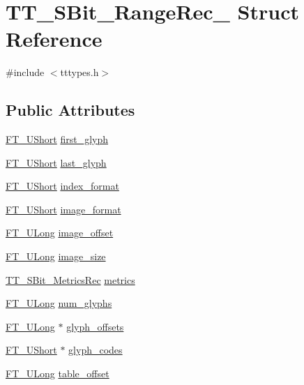 \hypertarget{struct_t_t___s_bit___range_rec__}{\section{T\-T\-\_\-\-S\-Bit\-\_\-\-Range\-Rec\-\_\- Struct Reference}
\label{struct_t_t___s_bit___range_rec__}
}


{\ttfamily \#include $<$tttypes.\-h$>$}

\subsection*{Public Attributes}
\begin{DoxyCompactItemize}
\item 
\hyperlink{fttypes_8h_a937f6c17cf5ffd09086d8610c37b9f58}{F\-T\-\_\-\-U\-Short} \hyperlink{struct_t_t___s_bit___range_rec___a4593c489959cf2dfc775970d21f3162d}{first\-\_\-glyph}
\item 
\hyperlink{fttypes_8h_a937f6c17cf5ffd09086d8610c37b9f58}{F\-T\-\_\-\-U\-Short} \hyperlink{struct_t_t___s_bit___range_rec___a1690b0033a710c685870da8aee88ae18}{last\-\_\-glyph}
\item 
\hyperlink{fttypes_8h_a937f6c17cf5ffd09086d8610c37b9f58}{F\-T\-\_\-\-U\-Short} \hyperlink{struct_t_t___s_bit___range_rec___a6b5d74c7fb4b8bf54d40ca231bdb42da}{index\-\_\-format}
\item 
\hyperlink{fttypes_8h_a937f6c17cf5ffd09086d8610c37b9f58}{F\-T\-\_\-\-U\-Short} \hyperlink{struct_t_t___s_bit___range_rec___a8925a35b94f8aa9cdf76f60f4e3293a0}{image\-\_\-format}
\item 
\hyperlink{fttypes_8h_a4fac88bdba78eb76b505efa6e4fbf3f5}{F\-T\-\_\-\-U\-Long} \hyperlink{struct_t_t___s_bit___range_rec___ae722956e1271128a44764e6126437c23}{image\-\_\-offset}
\item 
\hyperlink{fttypes_8h_a4fac88bdba78eb76b505efa6e4fbf3f5}{F\-T\-\_\-\-U\-Long} \hyperlink{struct_t_t___s_bit___range_rec___ad9ccb1529468dfcaf9e7a8946611413f}{image\-\_\-size}
\item 
\hyperlink{tttypes_8h_aa02b40c8ee47d8c0140946bce92409c7}{T\-T\-\_\-\-S\-Bit\-\_\-\-Metrics\-Rec} \hyperlink{struct_t_t___s_bit___range_rec___a79be8a9d51100d82b2d9582db861157a}{metrics}
\item 
\hyperlink{fttypes_8h_a4fac88bdba78eb76b505efa6e4fbf3f5}{F\-T\-\_\-\-U\-Long} \hyperlink{struct_t_t___s_bit___range_rec___afd9437150f8d9f784f98da6d61223464}{num\-\_\-glyphs}
\item 
\hyperlink{fttypes_8h_a4fac88bdba78eb76b505efa6e4fbf3f5}{F\-T\-\_\-\-U\-Long} $\ast$ \hyperlink{struct_t_t___s_bit___range_rec___a475f649f101b5886cc2443934e6aa9ca}{glyph\-\_\-offsets}
\item 
\hyperlink{fttypes_8h_a937f6c17cf5ffd09086d8610c37b9f58}{F\-T\-\_\-\-U\-Short} $\ast$ \hyperlink{struct_t_t___s_bit___range_rec___ad40d4aa7e48bdb4ab8c98850f1bba178}{glyph\-\_\-codes}
\item 
\hyperlink{fttypes_8h_a4fac88bdba78eb76b505efa6e4fbf3f5}{F\-T\-\_\-\-U\-Long} \hyperlink{struct_t_t___s_bit___range_rec___a54457937305b5ccf895f5b23c0cc6006}{table\-\_\-offset}
\end{DoxyCompactItemize}


